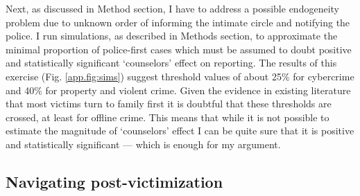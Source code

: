 \documentclass[]{interact}
\theoremstyle{plain}%
\theoremstyle{definition}
\theoremstyle{remark}
\newcommand\citep{\parencite}
\newcommand\citet{\textcite}
\begin{document}
	Next, as discussed in Method section, I have to address a possible endogeneity problem due to unknown order of informing the intimate circle and notifying the police. %
	I run simulations, as described in Methods section, to approximate the minimal proportion of police-first cases which must be assumed to doubt positive and statistically significant `counselors' effect on reporting. The results of this exercise (Fig. \ref{app.fig:sims}) suggest threshold values of about 25\% for cybercrime and 40\% for property and violent crime. Given the evidence in existing literature that most victims turn to family first \citep{ruback2001social, knoth2019reporting} it is doubtful that these thresholds are crossed, at least for offline crime. This means that while it is not possible to estimate the magnitude of `counselors' effect I can be quite sure that it is positive and statistically significant --- which is enough for my argument.
	

	\subsection*{Navigating post-victimization}
	
\end{document}
